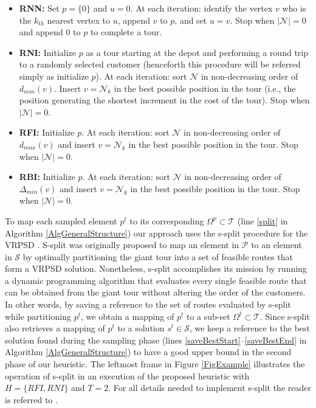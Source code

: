 \begin{itemize}
\small
\item \textbf{RNN:} Set $p=\{0\}$ and $u=0$. At each iteration: identify the vertex $v$ who is the $k_{th}$ nearest vertex to $u$, append $v$ to $p$, and set $u=v$. Stop when $|\mathcal{N}|=0$ and append $0$ to $p$ to complete a tour.
\item \textbf{RNI:} Initialize $p$ as a tour starting at the depot and performing a round trip to a randomly selected customer (henceforth this procedure will be referred simply as initialize $p$). At each iteration: sort $\mathcal{N}$ in non-decreasing order of $d_{min}(v)$. Insert $v=\mathcal{N}_{k}$ in the best possible position in the tour (i.e., the position generating the shortest increment in the cost of the tour). Stop when $|\mathcal{N}|=0$.
\item \textbf{RFI:} Initialize $p$. At each iteration: sort $\mathcal{N}$ in non-decreasing order of $d_{max}(v)$ and insert $v=\mathcal{N}_{k}$ in the best possible position in the tour. Stop when $|\mathcal{N}|=0$.
\item \textbf{RBI:} Initialize $p$. At each iteration: sort $\mathcal{N}$ in non-decreasing order of $\Delta_{min}(v)$ and insert $v=\mathcal{N}_{k}$ in the best possible position in the tour. Stop when $|\mathcal{N}|=0$.

\end{itemize}

To map each sampled element $p^{t}$ to its corresponding $\Omega^p\subset\mathcal{T}$ (line \ref{split} in Algorithm \ref{AlgGeneralStructure}) our approach uses the s-split procedure for the VRPSD \cite{Mendoza2010}. S-split was originally proposed to map an element in $\mathcal{P}$ to an element in $\mathcal{S}$ by optimally partitioning the giant tour into a set of feasible routes that form a VRPSD solution. Nonetheless, s-split  accomplishes its mission by running a dynamic programming algorithm that evaluates every single feasible route that can be obtained from the giant tour without altering the order of the customers. In other words, by saving a reference to the set of routes evaluated by s-split while partitioning $p^{t}$, we obtain a mapping of $p^{t}$ to a sub-set $\Omega^{t}\subset\mathcal{T}$. Since s-split also retrieves a mapping of $p^{t}$ to a solution $s^{t}\in\mathcal{S}$, we keep a reference to the best solution found during the sampling phase (lines \ref{saveBestStart}--\ref{saveBestEnd} in Algorithm \ref{AlgGeneralStructure}) to have a good upper bound in the second phase of our heuristic. The leftmost frame in Figure \ref{FigExample} illustrates the operation of s-split in an execution of the proposed heuristic with $H=\{RFI,RNI\}$ and $T=2$. For all details needed to implement s-split the reader is referred to \cite{Mendoza2010,Mendoza2011}.

